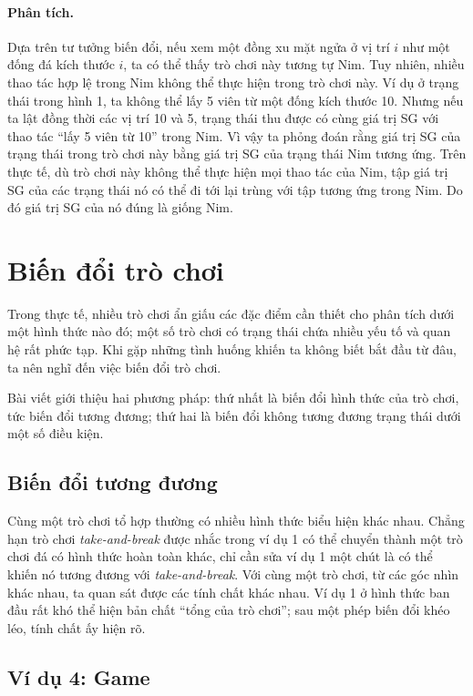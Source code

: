 \documentclass[11pt]{article}
\begin{document}
\paragraph{Phân tích.}
Dựa trên tư tưởng biến đổi, nếu xem một đồng xu mặt ngửa ở vị trí \(i\) như
một đống đá kích thước \(i\), ta có thể thấy trò chơi này tương tự Nim. Tuy
nhiên, nhiều thao tác hợp lệ trong Nim không thể thực hiện trong trò chơi này.
Ví dụ ở trạng thái trong hình 1, ta không thể lấy 5 viên từ một đống kích thước
10. Nhưng nếu ta lật đồng thời các vị trí 10 và 5, trạng thái thu được có cùng
giá trị SG với thao tác ``lấy 5 viên từ 10'' trong Nim. Vì vậy ta phỏng đoán
rằng giá trị SG của trạng thái trong trò chơi này bằng giá trị SG của trạng
thái Nim tương ứng. Trên thực tế, dù trò chơi này không thể thực hiện mọi thao
tác của Nim, tập giá trị SG của các trạng thái nó có thể đi tới lại trùng với
tập tương ứng trong Nim. Do đó giá trị SG của nó đúng là giống Nim.

\section{Biến đổi trò chơi}

Trong thực tế, nhiều trò chơi ẩn giấu các đặc điểm cần thiết cho phân tích dưới
một hình thức nào đó; một số trò chơi có trạng thái chứa nhiều yếu tố và quan
hệ rất phức tạp. Khi gặp những tình huống khiến ta không biết bắt đầu từ đâu,
ta nên nghĩ đến việc biến đổi trò chơi.

Bài viết giới thiệu hai phương pháp: thứ nhất là biến đổi hình thức của trò
chơi, tức biến đổi tương đương; thứ hai là biến đổi không tương đương trạng
thái dưới một số điều kiện.

\subsection{Biến đổi tương đương}

Cùng một trò chơi tổ hợp thường có nhiều hình thức biểu hiện khác nhau. Chẳng
hạn trò chơi \emph{take-and-break} được nhắc trong ví dụ 1 có thể chuyển thành
một trò chơi đá có hình thức hoàn toàn khác, chỉ cần sửa ví dụ 1 một chút là
có thể khiến nó tương đương với \emph{take-and-break}. Với cùng một trò chơi,
từ các góc nhìn khác nhau, ta quan sát được các tính chất khác nhau. Ví dụ 1 ở
hình thức ban đầu rất khó thể hiện bản chất ``tổng của trò chơi''; sau một phép
biến đổi khéo léo, tính chất ấy hiện rõ.

\subsection*{Ví dụ 4: Game}
\end{document}

